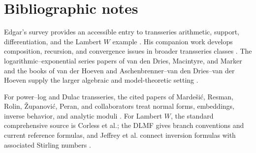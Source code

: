 \documentclass[11pt,openany]{book}
\theoremstyle{definition}
\theoremstyle{plain}
\theoremstyle{remark}
\begin{document}
\backmatter

\chapter*{Bibliographic notes}
Edgar's survey provides an accessible entry to transseries arithmetic, support, differentiation, and the Lambert \(W\) example \cite{edgar-beginners}. His companion work develops composition, recursion, and convergence issues in broader transseries classes \cite{edgar-composition}. The logarithmic--exponential series papers of van den Dries, Macintyre, and Marker and the books of van der Hoeven and Aschenbrenner--van den Dries--van der Hoeven supply the larger algebraic and model-theoretic setting \cite{vdDMM-1997,vdDMM-2001,vdhoeven-book,adh-book}.

For power--log and Dulac transseries, the cited papers of Marde\v{s}i\'c, Resman, Rolin, \v{Z}upanovi\'c, Peran, and collaborators treat normal forms, embeddings, inverse behavior, and analytic moduli \cite{mardesic-normalforms,mardesic-length,resman-dulac,peran-logtransseries}. For Lambert \(W\), the standard comprehensive source is Corless et al.; the DLMF gives branch conventions and current reference formulas, and Jeffrey et al. connect inversion formulas with associated Stirling numbers \cite{corless-W,dlmf-W,jeffrey-W}.
\end{document}

